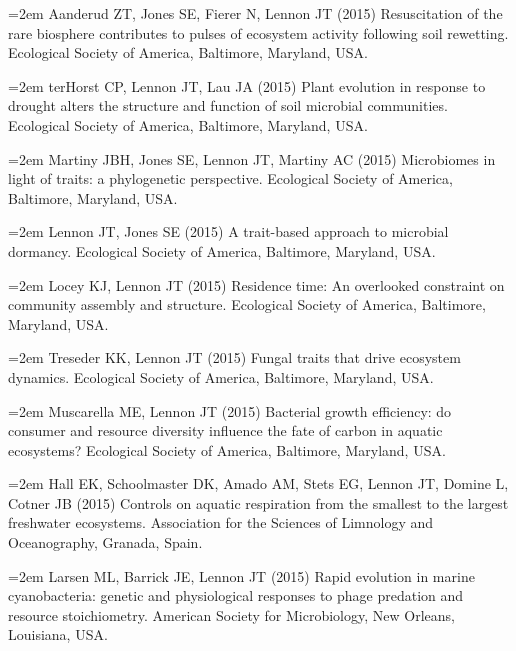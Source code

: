 \documentclass[11pt]{article}
\begin{document}
{\hangindent=2em Aanderud ZT, Jones SE, Fierer N, Lennon JT (2015) Resuscitation of the rare biosphere contributes to pulses of ecosystem activity following soil rewetting. Ecological Society of America, Baltimore, Maryland, USA. \par

\hangindent=2em terHorst CP, Lennon JT, Lau JA (2015) Plant evolution in response to drought alters the structure and function of soil microbial communities. Ecological Society of America, Baltimore, Maryland, USA. \par

\hangindent=2em Martiny JBH, Jones SE, Lennon JT, Martiny AC (2015) Microbiomes in light of traits: a phylogenetic perspective. Ecological Society of America, Baltimore, Maryland, USA. \par

\hangindent=2em Lennon JT, Jones SE (2015) A trait-based approach to microbial dormancy. Ecological Society of America, Baltimore, Maryland, USA. \par

\hangindent=2em Locey KJ, Lennon JT (2015) Residence time: An overlooked constraint on community assembly and structure. Ecological Society of America, Baltimore, Maryland, USA. \par

\hangindent=2em Treseder KK, Lennon JT (2015) Fungal traits that drive ecosystem dynamics. Ecological Society of America, Baltimore, Maryland, USA. \par

\hangindent=2em Muscarella ME, Lennon JT (2015) Bacterial growth efficiency: do consumer and resource diversity influence the fate of carbon in aquatic ecosystems? Ecological Society of America, Baltimore, Maryland, USA. \par

\hangindent=2em Hall EK, Schoolmaster DK, Amado AM, Stets EG, Lennon JT, Domine L, Cotner JB (2015) Controls on aquatic respiration from the smallest to the largest freshwater ecosystems. Association for the Sciences of Limnology and Oceanography, Granada, Spain. \par

\hangindent=2em Larsen ML, Barrick JE, Lennon JT (2015) Rapid evolution in marine cyanobacteria: genetic and physiological responses to phage predation and resource stoichiometry. American Society for Microbiology, New Orleans, Louisiana, USA. \par

}
\end{document}
